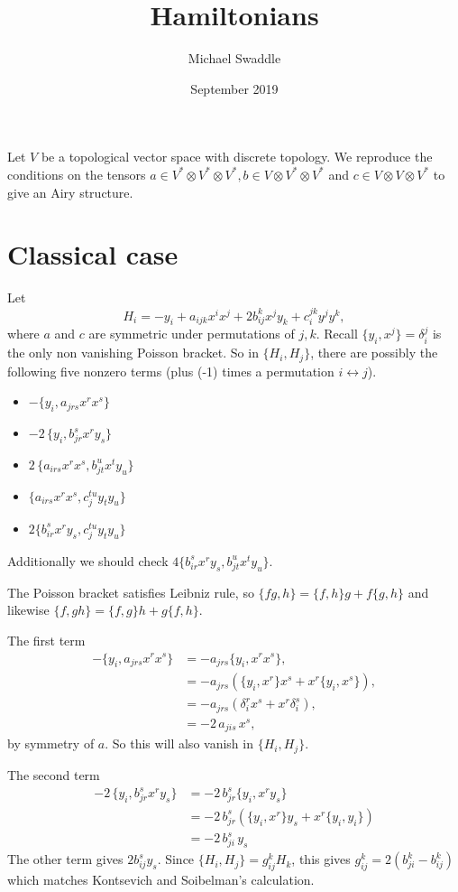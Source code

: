 \documentclass{article}
\title{Hamiltonians}
\author{Michael Swaddle}
\date{September 2019}
\begin{document}
    Let \(V\) be a topological vector space with discrete topology.
    We reproduce the conditions on the tensors \( a \in V^* \otimes V^* \otimes V^*, b \in V \otimes V^* \otimes V^*\) and \(c \in V \otimes V \otimes V^*\) to give an Airy structure.
\section{Classical case}
    Let
    \[ H_i = -y_i + a_{ijk} x^i x^j + 2 b_{ij}^k x^j y_k + c_i^{jk} y^j y^k, \]
    where \( a\) and \(c\) are symmetric under permutations of \(j,k\). Recall \( \{ y_i , x^j \} = \delta_i^j \) is the only non vanishing Poisson bracket. So in \( \{ H_i, H_j \} \), there are possibly the following five nonzero terms (plus (-1) times a permutation \( i \leftrightarrow j \)).
    \begin{itemize}
        \item \( -\{  y_i, a_{jrs} x^r x^s \}\) 
        \item \( -2\,\{  y_i , b_{jr}^s x^r y_s \} \)
        \item \( 2 \, \{ a_{irs} x^r x^s, b_{jt}^{u} x^t y_u \} \)
        \item \(  \{ a_{irs} x^r x^s, c_{j}^{t u} y_t y_u \} \)
        \item \(2 \{ b_{ir}^s x^r y_s , c_{j}^{t u} y_t y_u \} \)
    \end{itemize}
    Additionally we should check \(4 \{ b_{ir}^s x^r y_s ,b_{jt}^u x^t y_u\} \).
    
    The Poisson bracket satisfies Leibniz rule, so \( \{ f g  , h \}  = \{ f, h \} g + f \{g,h\} \) and likewise \( \{ f , g h \} = \{ f,g\} h + g \{ f , h\} \).
    
    The first term
    \begin{align*}
      -\{  y_i, a_{jrs} x^r x^s \}   & = -a_{jrs} \{ y_i, x^r x^s  \} ,\\
                                     &= -a_{jrs} \left( \{ y_i, x^r\} x^s + x^r \{ y_i, x^s \} \right) ,\\ 
                                     &= - a_{jrs} \left( \delta_i^r x^s + x^r \delta^s_i \right) ,\\
                                     &= - 2 \, a_{jis} \, x^s,
    \end{align*}
    by symmetry of \(a\). So this will also vanish in \( \{ H_i, H_j \} \).
    
    The second term
    \begin{align*}
        -2\,\{  y_i , b_{jr}^s x^r y_s \} &= -2 \, b_{jr}^s \{y_i, x^r y_s\} \\
                                          &= -2 \, b_{jr}^s \left( \{y_i, x^r\}  y_s + x^r \{ y_i ,y_i\} \right) \\
                                          & = -2 \, b_{ji}^s \, y_s
    \end{align*}
    The other term gives \(  2 b_{ij}^s y_s \).  Since \( \{ H_i , H_j \} = g_{ij}^k H_k \), this gives
    \( g_{ij}^k = 2 \left( b_{ji}^k - b_{i j}^k\right) \) which matches Kontsevich and Soibelman's calculation. 
    
\end{document}
